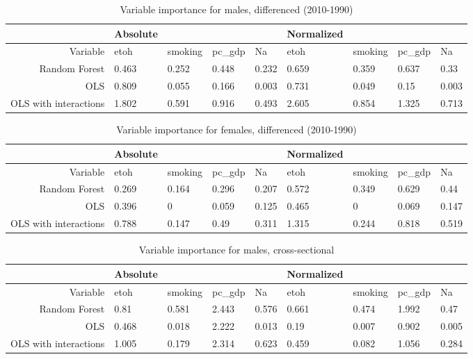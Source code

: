 \documentclass[11pt]{article}\usepackage[]{graphicx}\usepackage[]{color}
\begin{document}
 
\begin{table}[ht]
\centering
\begin{tabular}{r|llll|llll}
   \hline
 & Absolute &  &  &  & Normalized &  &  &  \\ 
   \hline
Variable & etoh & smoking & pc\_gdp & Na & etoh & smoking & pc\_gdp & Na \\ 
  Random Forest & 0.463 & 0.252 & 0.448 & 0.232 & 0.659 & 0.359 & 0.637 & 0.33 \\ 
  OLS & 0.809 & 0.055 & 0.166 & 0.003 & 0.731 & 0.049 & 0.15 & 0.003 \\ 
  OLS with interactions & 1.802 & 0.591 & 0.916 & 0.493 & 2.605 & 0.854 & 1.325 & 0.713 \\ 
   \hline
\end{tabular}
\caption{Variable importance for males, differenced (2010-1990)} 
\end{table}
\begin{table}[ht]
\centering
\begin{tabular}{r|llll|llll}
   \hline
 & Absolute &  &  &  & Normalized &  &  &  \\ 
   \hline
Variable & etoh & smoking & pc\_gdp & Na & etoh & smoking & pc\_gdp & Na \\ 
  Random Forest & 0.269 & 0.164 & 0.296 & 0.207 & 0.572 & 0.349 & 0.629 & 0.44 \\ 
  OLS & 0.396 & 0 & 0.059 & 0.125 & 0.465 & 0 & 0.069 & 0.147 \\ 
  OLS with interactions & 0.788 & 0.147 & 0.49 & 0.311 & 1.315 & 0.244 & 0.818 & 0.519 \\ 
   \hline
\end{tabular}
\caption{Variable importance for females, differenced (2010-1990)} 
\end{table}
\begin{table}[ht]
\centering
\begin{tabular}{r|llll|llll}
   \hline
 & Absolute &  &  &  & Normalized &  &  &  \\ 
   \hline
Variable & etoh & smoking & pc\_gdp & Na & etoh & smoking & pc\_gdp & Na \\ 
  Random Forest & 0.81 & 0.581 & 2.443 & 0.576 & 0.661 & 0.474 & 1.992 & 0.47 \\ 
  OLS & 0.468 & 0.018 & 2.222 & 0.013 & 0.19 & 0.007 & 0.902 & 0.005 \\ 
  OLS with interactions & 1.005 & 0.179 & 2.314 & 0.623 & 0.459 & 0.082 & 1.056 & 0.284 \\ 
   \hline
\end{tabular}
\caption{Variable importance for males, cross-sectional} 
\end{table}
\end{document}
